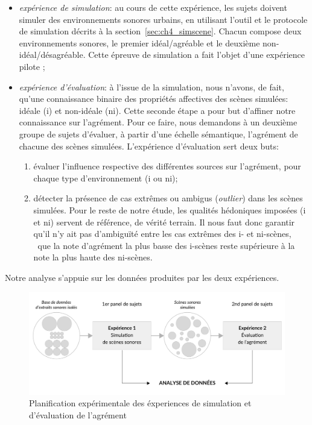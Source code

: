 \begin{itemize}
\item \emph{expérience de simulation}: au cours de cette expérience, les sujets doivent simuler des environnements sonores urbains, en utilisant l'outil et le protocole de simulation décrits à la section~\ref{sec:ch4_simscene}. Chacun compose deux environnements sonores, le premier idéal/agréable et le deuxième non-idéal/désagréable. Cette épreuve de simulation a fait l'objet d'une expérience pilote \citep{lafay2013atiam,lafay2014new}; 


\item \emph{expérience d'évaluation}: à l'issue de la simulation, nous n'avons, de fait, qu'une connaissance binaire des propriétés affectives des scènes simulées: idéale (i) et non-idéale (ni). Cette seconde étape a pour but d'affiner notre connaissance sur l'agrément. Pour ce faire, nous demandons à un deuxième groupe de sujets d'évaluer, à partir d'une échelle sémantique, l'agrément de chacune des scènes simulées. L'expérience d'évaluation sert deux buts:

\begin{enumerate}
\item évaluer l'influence respective des différentes sources sur l'agrément, pour chaque type d'environnement (i ou ni);
\item détecter la présence de cas extrêmes ou ambigus (\emph{outlier}) dans les scènes simulées. Pour le reste de notre étude, les qualités hédoniques imposées (i et ni) servent de référence, de vérité terrain. Il nous faut donc garantir qu'il n'y ait pas d’ambiguïté entre les cas extrêmes des i- et ni-scènes, \ie~que la note d'agrément la plus basse des i-scènes reste supérieure à la note la plus haute des ni-scènes.
\end{enumerate}

\end{itemize}

Notre analyse s'appuie sur les données produites par les deux expériences.

\begin{figure}[t]
        \myfloatalign
        \includegraphics[width=.8\linewidth]{gfx/ch_5/5}
        \caption{Planification expérimentale des éxperiences de simulation et d'évaluation de l'agrément}\label{fig:xp1_2}
\end{figure}


